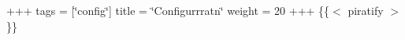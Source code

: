 +++ tags = \mbox{[}\char`\"{}config\char`\"{}\mbox{]} title = \char`\"{}\+Configurrrat\textquotesingle{}n\char`\"{} weight = 20 +++ \{\{$<$ piratify $>$\}\} 